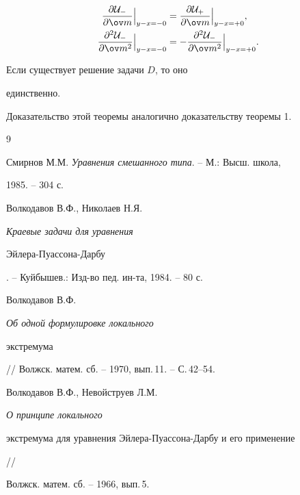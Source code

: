 \begin{align*} 


\frac{\partial\cal U_-}{\partial\ov m}\Big|_{y-x=-0}&= 


\frac{\partial\cal U_+}{\partial\ov m}\Big|_{y-x=+0}, \\ 


\frac{\partial^2\cal U_-}{\partial\ov m^2}\Big|_{y-x=-0}&= 


-\frac{\partial^2\cal U_-}{\partial\ov m^2} 


\Big|_{y-x=+0}. 


\end{align*} 


 


\begin{thm} Если существует решение задачи $D$, то оно 


единственно. 


\end{thm} 


 


Доказательство этой теоремы аналогично доказательству теоремы 1. 


 


\begin{thebibliography}{9} 


 




Смирнов М.М. {\em Уравнения смешанного типа}. -- М.: Высш. школа,  


1985. -- 304 с. 




Волкодавов В.Ф., Николаев Н.Я. {\em Краевые задачи для уравнения  


Эйлера-Пуассона-Дарбу}. -- Куйбышев.: Изд-во пед. ин-та, 1984. -- 80 с. 




Волкодавов В.Ф. {\em Об одной формулировке локального  


экстремума} // Волжск. матем. сб. -- 1970, вып.\,11. -- С.\,42--54. 




Волкодавов В.Ф., Невойструев Л.М. {\em О принципе локального 


экстремума для уравнения Эйлера-Пуассона-Дарбу и его применение} // 


Волжск. матем. сб. -- 1966, вып.\,5.


 


\end{thebibliography} 


 


\vskip 2cm 


 


 








\label{end} 


 


